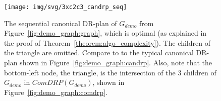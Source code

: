 

\begin{figure}\centering%
  \texttt{[image: img/svg/3xc2c3\_candrp\_seq]}
  \caption{The sequential canonical DR-plan of $G_{demo}$ from Figure~\ref{fig:demo_graph:graph}, which is optimal (as explained in the proof of Theorem~\ref{theorem:algo_complexity}). The children of the triangle are omitted. Compare to to the typical canonical DR-plan shown in Figure~\ref{fig:demo_graph:candrp}. Also, note that the bottom-left node, the triangle, is the intersection of the 3 children of $G_{demo}$ in $ComDRP(G_{demo})$, shown in Figure~\ref{fig:demo_graph:comdrp}.}
  \label{fig:demo_graph:candrpseq}
\end{figure}%

